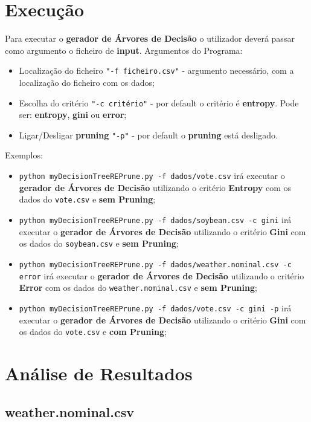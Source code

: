 \documentclass[11pt]{article}   %
\begin{document}
\section{Execução}
\hspace{0,5cm}Para executar o \textbf{gerador de Árvores de Decisão} o utilizador deverá passar como argumento o ficheiro de \textbf{input}.
Argumentos do Programa:
\begin{itemize}
    \item Localização do ficheiro \verb|"-f ficheiro.csv"| - argumento necessário, com a localização do ficheiro com os dados;
    \item Escolha do critério \verb|"-c critério"| - por default o critério é \textbf{entropy}. Pode ser: \textbf{entropy}, \textbf{gini} ou \textbf{error};
    \item Ligar/Desligar \textbf{pruning} \verb|"-p"| - por default o \textbf{pruning} está desligado.
\end{itemize}
\par Exemplos:
\begin{itemize}
    \item \verb|python myDecisionTreeREPrune.py -f dados/vote.csv| irá executar o \textbf{gerador de Árvores de Decisão} utilizando o critério \textbf{Entropy} com os dados do \verb|vote.csv| e \textbf{sem Pruning};
    \item \verb|python myDecisionTreeREPrune.py -f dados/soybean.csv -c gini| irá executar o \textbf{gerador de Árvores de Decisão} utilizando o critério \textbf{Gini} com os dados do \verb|soybean.csv| e \textbf{sem Pruning};
    \item \verb|python myDecisionTreeREPrune.py -f dados/weather.nominal.csv -c error| irá executar o \textbf{gerador de Árvores de Decisão} utilizando o critério \textbf{Error} com os dados do \verb|weather.nominal.csv| e \textbf{sem Pruning};
    \item \verb|python myDecisionTreeREPrune.py -f dados/vote.csv -c gini -p| irá executar o \textbf{gerador de Árvores de Decisão} utilizando o critério \textbf{Gini} com os dados do \verb|vote.csv| e \textbf{com Pruning};
\end{itemize}
\section{Análise de Resultados}
\subsection{weather.nominal.csv}
    
\end{document}
